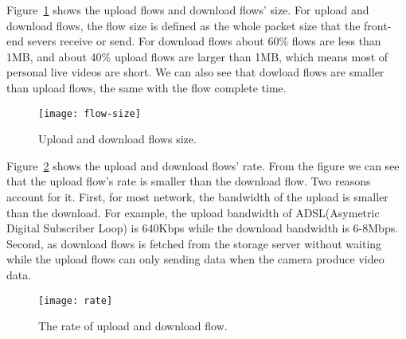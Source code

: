 Figure~\ref{fig:flow-size} shows the upload flows and download flows' size. For upload and download flows, the flow size is defined as the whole packet size that the front-end severs receive or send. For download flows about 60\% flows are less than 1MB, and about 40\% upload flows are larger than 1MB, which means most of personal live videos are short. We can also see that dowload flows are smaller than upload flows, the same with the flow complete time.

\begin{figure}[ht]
	\centering
	\texttt{[image: flow-size]}
	\caption{Upload and download flows size.}
	\label{fig:flow-size}
	\termspace
\end{figure}

Figure~\ref{fig:flow-rate} shows the upload and download flows' rate. From the figure we can see that the upload flow's rate is smaller than the download flow. Two reasons account for it. First, for most network, the bandwidth of the upload is smaller than the download. For example, the upload bandwidth of ADSL(Asymetric Digital Subscriber Loop) is 640Kbps while the download bandwidth is 6-8Mbps. Second, as download flows is fetched from the storage server without waiting while the upload flows can only sending data when the camera produce video data. 
\begin{figure}[ht]
	\centering
	\texttt{[image: rate]}
	\caption{The rate of upload and download flow.}
	\label{fig:flow-rate}
	\termspace
\end{figure}
